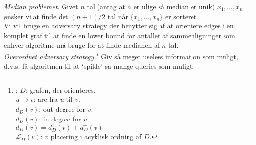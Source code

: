 \textit{Median problemet.} Givet $n$ tal (antag at $n$ er ulige så median er unik) $x_1,\ldots,x_n$ ønsker vi at finde det $(n+1)/2$ tal når $\{x_1,\ldots,x_n\}$ er sorteret. \\

Vi vil bruge en adversary strategy der benytter sig af at orientere edges i en komplet graf til at finde en lower bound for antallet af sammenligninger som enhver algoritme må bruge for at finde medianen af $n$ tal. \\

\textit{Overordnet adversary strategy.\footnote{: $D$: grafen, der orienteres. \\ $u\rightarrow v$: arc fra $u$ til $v$. \\ $d_D^+(v)$: out-degree for $v$. \\ $d_D^-(v)$: in-degree for $v$. \\ $d_D(v)=d_D^+(v) + d_D^-(v)$ \\ $\mathcal{L}_D(v)$: $v$ placering i acyklisk ordning af $D$.}} Giv så meget useless information som muligt, d.v.s. få algoritmen til at `spilde' så mange queries som muligt. \\

